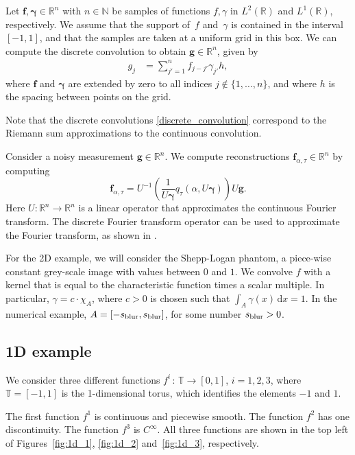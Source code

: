 \documentclass[a4paper]{article}
\def\Re{\mathds{R}}
\def\vgf{\mathbf{f}}
\def\vgg{\mathbf{g}}
\def\ggg{\boldsymbol{\gamma}}
\def\ud{\,\mathrm{d}}
\begin{document}
Let $\vgf,\ggg\in\Re^{n}$ with $n\in \mathbb{N}$ be samples of functions $f,\gamma$ in $L^2(\Re)$
and $L^1(\Re)$, respectively. We assume that
the support of~$f$ and~$\gamma$ is contained in
the interval $[-1,1]$, and that the samples are taken at a uniform grid in this box. We can compute the discrete convolution to obtain $\vgg\in\Re^{n}$, given by
\begin{equation}
\label{discrete_convolution}
\begin{split}
    g_j &= \sum_{j'=1}^n f_{j-j'}\gamma_{j'}h,
 \end{split}
\end{equation}
where $\vgf$ and $\ggg$ are extended by zero to
all indices $j\notin \{1,\hdots,n\}$, and where $h$
is the spacing between points on the grid.

Note that the discrete convolutions
\eqref{discrete_convolution} correspond to the
Riemann sum approximations to the continuous
convolution.

Consider a noisy measurement $\vgg\in \Re^{n}$.
We compute reconstructions $\vgf_{\alpha,\tau}\in \Re^{n}$
by computing
\begin{equation}
\label{reconstruction_formula}
    \vgf_{\alpha,\tau} = U^{-1}\left(\frac{1}{U\ggg}
    q_{\tau}(\alpha,U\ggg)\right) U\vgg.
\end{equation}
Here $U: \Re^{n}\to \Re^{n}$ is a linear operator
that approximates the continuous Fourier transform.
The discrete Fourier transform operator can be used
to approximate the Fourier transform, as shown
in \cite{bailey}.

For the 2D example, we will consider the Shepp-Logan
phantom, a piece-wise constant grey-scale image with
values between $0$ and $1$. We convolve $f$ with a
kernel that is equal to the characteristic function
times a scalar multiple. In particular,
$\gamma=c\cdot\chi_A$, where $c>0$ is chosen such
that $\int_A \gamma(x)\ud x = 1$. In the numerical example,
$A = [-s_{\rm blur}, s_{\rm blur}]$, for some number
$s_{\rm blur}>0$. 

\subsection{1D example}

We consider three different functions
$f^i\,:\, \mathbb{T} \to [0,1]$, $i=1,2,3$,
where $\mathbb{T} = [-1,1]$ is the 1-dimensional torus,
which identifies the elements $-1$ and $1$.

The first function $f^1$ is continuous and piecewise smooth.
The function $f^2$ has one discontinuity. The function $f^3$
is $C^\infty$. All three functions are shown in the top left
of Figures~\ref{fig:1d_1}, \ref{fig:1d_2} and~\ref{fig:1d_3},
respectively.
\end{document}
